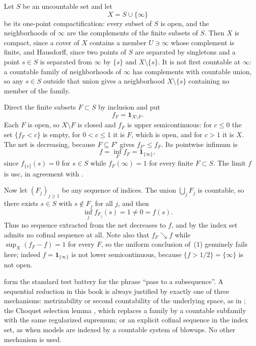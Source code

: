 \begin{example}
\label{ex:decreasing-net-not-sequential}
Let $S$ be an uncountable set and let
\[
 X=S\cup\{\infty\}
\]
be its one-point compactification: every subset of $S$ is open, and the
neighborhoods of $\infty$ are the complements of the finite subsets of $S$.
Then $X$ is compact, since a cover of $X$ contains a member $U\ni\infty$ whose
complement is finite, and Hausdorff, since two points of $S$ are separated by
singletons and a point $s\in S$ is separated from $\infty$ by $\{s\}$ and
$X\setminus\{s\}$.  It is not first countable at $\infty$: a countable family
of neighborhoods of $\infty$ has complements with countable union, so any
$s\in S$ outside that union gives a neighborhood $X\setminus\{s\}$ containing
no member of the family.

Direct the finite subsets $F\subset S$ by inclusion and put
\[
 f_F=\mathbf 1_{X\setminus F}.
\]
Each $F$ is open, so $X\setminus F$ is closed and $f_F$ is upper
semicontinuous: for $c\leq0$ the set $\{f_F<c\}$ is empty, for $0<c\leq1$ it
is $F$, which is open, and for $c>1$ it is $X$.  The net is decreasing,
because $F\subseteq F'$ gives $f_{F'}\leq f_F$.  Its pointwise infimum is
\[
 f=\inf_Ff_F=\mathbf 1_{\{\infty\}},
\]
since $f_{\{s\}}(s)=0$ for $s\in S$ while $f_F(\infty)=1$ for every finite
$F\subset S$.  The limit $f$ is usc, in agreement with
.

Now let $(F_j)_{j\geq1}$ be any sequence of indices.  The union
$\bigcup_jF_j$ is countable, so there exists $s\in S$ with $s\notin F_j$ for
all $j$, and then
\[
 \inf_jf_{F_j}(s)=1\neq0=f(s).
\]
Thus no sequence extracted from the net decreases to $f$, and by
 the index set admits no cofinal sequence at all.
Note also that $f_F\searrow f$ while $\sup_X(f_F-f)=1$ for every $F$, so the
uniform conclusion of \,(1) genuinely fails here; indeed
$f=\mathbf 1_{\{\infty\}}$ is not lower semicontinuous, because
$\{f>1/2\}=\{\infty\}$ is not open.
\end{example}

\begin{remark}
\label{rem:net-vs-sequence-checklist}
form the standard test battery for the phrase ``pass to a subsequence''.  A
sequential reduction in this book is always justified by exactly one of three
mechanisms: metrizability or second countability of the underlying space, as
in ; the Choquet selection lemma
, which replaces a family by a countable
subfamily with the same regularized supremum; or an explicit cofinal sequence
in the index set, as when models are indexed by a countable system of blowups.
No other mechanism is used.
\end{remark}

